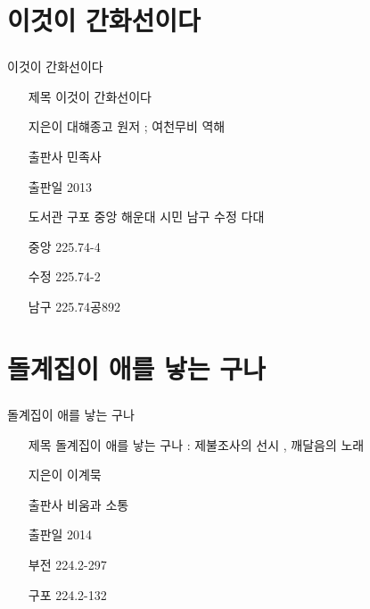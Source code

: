 \documentclass[aspectratio=1610,17pt,xcolor=pdftex,dvipsnames,table,handout]{beamer}
\begin{document}
		\section{ 이것이 간화선이다 }
		\begin{frame} [t,plain]
		\frametitle{}
			\begin{block} { 이것이 간화선이다 }
			\setlength{\leftmargini}{4em}			
			\begin{itemize}
				\item [제목]  	이것이 간화선이다 
				\item [지은이]	대햬종고 원저 ; 여천무비 역해
				\item [출판사]	민족사
				\item [출판일]	2013
				\item [도서관]	구포 중앙 해운대 시민 남구 수정 다대
				\item [중앙]		225.74-4
				\item [수정]		225.74-2
				\item [남구]		225.74공892
			\end{itemize}
			\end{block}						
		\end{frame}						


		\section{ 돌계집이 애를 낳는 구나 }
		\begin{frame} [t,plain]
		\frametitle{}
			\begin{block} { 돌계집이 애를 낳는 구나 }
			\setlength{\leftmargini}{4em}			
			\begin{itemize}
				\item [제목]  	돌계집이 애를 낳는 구나 : 제불조사의 선시 , 깨달음의 노래
				\item [지은이]	이계묵
				\item [출판사]	비움과 소통
				\item [출판일]	2014
				\item [부전]		224.2-297
				\item [구포]		224.2-132
			\end{itemize}
			\end{block}						
		\end{frame}						
\end{document}
